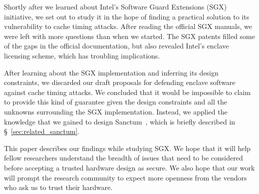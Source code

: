 
Shortly after we learned about Intel's Software Guard Extensions
(SGX) initiative, we set out to study it in the hope of finding a practical
solution to its vulnerability to cache timing attacks. After reading the
official SGX manuals, we were left with more questions than when we started.
The SGX patents filled some of the gaps in the official documentation, but also
revealed Intel's enclave licensing scheme, which has troubling implications.

After learning about the SGX implementation and inferring its design
constraints, we discarded our draft proposals for defending enclave software
against cache timing attacks. We concluded that it would be impossible to claim
to provide this kind of guarantee given the design constraints and all the
unknowns surrounding the SGX implementation. Instead, we applied the knowledge
that we gained to design Sanctum~\cite{costan2015sanctum}, which is briefly
described in \S~\ref{sec:related_sanctum}.

This paper describes our findings while studying SGX. We hope that it will help
fellow researchers understand the breadth of issues that need to be considered
before accepting a trusted hardware design as secure. We also hope that our
work will prompt the research community to expect more openness from the
vendors who ask us to trust their hardware.
